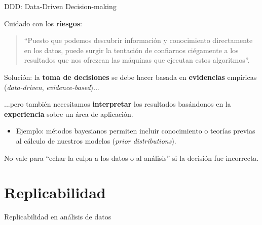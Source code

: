 
\begin{frame}{DDD: Data-Driven Decision-making}
 \begin{wideitemize}
  \item Cuidado con los \textbf{riesgos}:
  \begin{quotation}
``Puesto que podemos descubrir información y conocimiento directamente en
los datos, puede surgir la tentación de confiarnos ciégamente a los resultados
que nos ofrezcan las máquinas que ejecutan estos algoritmos''.
  \end{quotation} 
  
  \item Solución: la \textbf{toma de decisiones} se debe hacer basada en
  \textbf{evidencias} empíricas (\textit{data-driven}, \textit{evidence-based})...
  
  \item ...pero también necesitamos \textbf{interpretar} los resultados basándonos en la
  \textbf{experiencia} sobre un área de aplicación.
  
  \begin{itemize}
   \item Ejemplo: métodos bayesianos permiten incluir conocimiento o teorías previas
   al cálculo de nuestros modelos (\textit{prior distributions}).
  \end{itemize}

  
  \item No vale para ``echar la culpa a los datos o al análisis'' si la decisión 
  fue incorrecta.

 \end{wideitemize}

\end{frame}


\section{Replicabilidad}

\begin{frame}{}
\begin{center}
 \huge Replicabilidad en análisis de datos
\end{center}
\end{frame}


